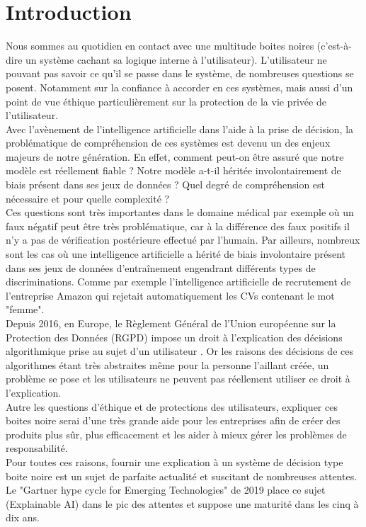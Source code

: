 \chapter*{Introduction}
\label{chap:introduction}
\vspace{5mm}
Nous sommes au quotidien en contact avec une multitude boites noires (c’est-à-dire un système cachant sa logique interne à l’utilisateur). L’utilisateur ne pouvant pas savoir ce qu’il se passe dans le système, de nombreuses questions se posent. Notamment sur la confiance à accorder en ces systèmes, mais aussi d’un point de vue éthique particulièrement sur la protection de la vie privée de l’utilisateur.\\

Avec l’avènement de l’intelligence artificielle dans l’aide à la prise de décision, la problématique de compréhension de ces systèmes est devenu un des enjeux majeurs de notre génération. En effet, comment peut-on être assuré que notre modèle est réellement fiable ? Notre modèle a-t-il héritée involontairement de biais présent dans ses jeux de données ? Quel degré de compréhension est nécessaire et pour quelle complexité ?\\
Ces questions sont très importantes dans le domaine médical par exemple où un faux négatif peut être très problématique, car à la différence des faux positifs il n'y a pas de vérification postérieure effectué par l'humain. Par ailleurs, nombreux sont les cas où une intelligence artificielle a hérité de biais involontaire présent dans ses jeux de données d'entraînement engendrant différents types de discriminations. Comme par exemple l'intelligence artificielle de recrutement de l'entreprise Amazon qui rejetait automatiquement les CVs contenant le mot "femme".\\

Depuis 2016, en Europe, le Règlement Général de l'Union européenne sur la Protection des Données (RGPD) impose un droit à l'explication des décisions algorithmique prise au sujet d'un utilisateur \cite{RGPDexplanRight}. Or les raisons des décisions de ces algorithmes étant très abstraites même pour la personne l'aillant créée, un problème se pose et les utilisateurs ne peuvent pas réellement utiliser ce droit à l'explication.\\

Autre les questions d'éthique et de protections des utilisateurs, expliquer ces boites noire serai d'une très grande aide pour les entreprises afin de créer des produits plus sûr, plus efficacement et les aider à mieux gérer les problèmes de responsabilité.\\
Pour toutes ces raisons, fournir une explication à un système de décision type boite noire est un sujet de parfaite actualité et suscitant de nombreuses attentes. Le "Gartner hype cycle for Emerging Technologies" de 2019 place ce sujet (Explainable AI) dans le pic des attentes et suppose une maturité dans les cinq à dix ans.\\ 

